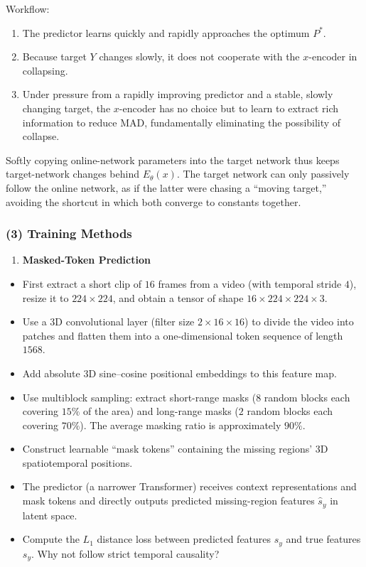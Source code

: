 Workflow:

\begin{enumerate}
\def\labelenumi{\arabic{enumi}.}
\tightlist
\item
  The predictor learns quickly and rapidly approaches the optimum \(P^{*}\).
\item
  Because target \(Y\) changes slowly, it does not cooperate with the \(x\)-encoder in collapsing.
\item
  Under pressure from a rapidly improving predictor and a stable, slowly changing target, the \(x\)-encoder has no choice but to learn to extract rich information to reduce MAD, fundamentally eliminating the possibility of collapse.
\end{enumerate}

Softly copying online-network parameters into the target network thus keeps target-network changes behind \(E_\theta(x)\). The target network can only passively follow the online network, as if the latter were chasing a ``moving target,'' avoiding the shortcut in which both converge to constants together.

\hypertarget{training-methods}{%
\subsubsection{(3) Training Methods}\label{training-methods}}

\begin{enumerate}
\def\labelenumi{\arabic{enumi}.}
\tightlist
\item
  \textbf{Masked-Token Prediction}
\end{enumerate}

\begin{itemize}
\item
  First extract a short clip of \(16\) frames from a video (with temporal stride \(4\)), resize it to \(224\times224\), and obtain a tensor of shape \(16\times224\times224\times3\).
\item
  Use a 3D convolutional layer (filter size \(2\times16\times16\)) to divide the video into patches and flatten them into a one-dimensional token sequence of length \(1568\).
\item
  Add absolute 3D sine--cosine positional embeddings to this feature map.
\item
  Use multiblock sampling: extract short-range masks (\(8\) random blocks each covering \(15\%\) of the area) and long-range masks (\(2\) random blocks each covering \(70\%\)). The average masking ratio is approximately \(90\%\).
\item
  Construct learnable ``mask tokens'' containing the missing regions' 3D spatiotemporal positions.
\item
  The predictor (a narrower Transformer) receives context representations and mask tokens and directly outputs predicted missing-region features \(\hat{s}_y\) in latent space.
\item
  Compute the \(L_1\) distance loss between predicted features \(\hat{s}_y\) and true features \(s_y\).
  Why not follow strict temporal causality?
\end{itemize}

